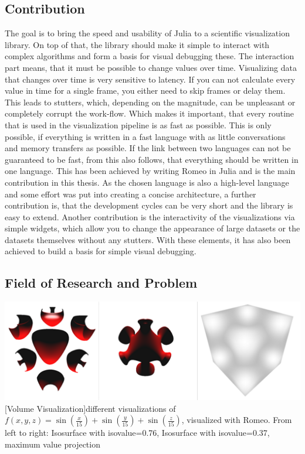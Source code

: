 \subsection{Contribution}

The goal is to bring the speed and usability of Julia to a scientific visualization library.
On top of that, the library should make it simple to interact with complex algorithms and form a basis for visual debugging these.
The interaction part means, that it must be possible to change values over time.
Visualizing data that changes over time is very sensitive to latency. 
If you can not calculate every value in time for a single frame, you either need to skip frames or delay them.
This leads to stutters, which, depending on the magnitude, can be unpleasant or completely corrupt the work-flow.
Which makes it important, that every routine that is used in the visualization pipeline is as fast as possible.
This is only possible, if everything is written in a fast language with as little conversations and memory transfers as possible. If the link between two languages can not be guaranteed to be fast, from this also follows, that everything should be written in one language.
This has been achieved by writing Romeo in Julia and is the main contribution in this thesis.
As the chosen language is also a high-level language and some effort was put into creating a concise architecture, a further contribution is, that the development cycles can be very short and the library is easy to extend.
Another contribution is the interactivity of the visualizations via simple widgets, which allow you to change the appearance of large datasets or the datasets themselves without any stutters.
With these elements, it has also been achieved to build a basis for simple visual debugging.


\subsection{Field of Research and Problem}

\vspace{1em}
\begin{minipage}{\linewidth}
    \centering
    \includegraphics[width=0.7\linewidth]{graphics/surfaces.png}
    [Volume Visualization]{different visualizations of $f(x,y,z)=\sin(\frac{x}{15})+\sin(\frac{y}{15})+\sin(\frac{z}{15})$, visualized with Romeo. From left to right: Isosurface with isovalue=0.76, Isosurface with isovalue=0.37, maximum value projection}
    \label{fig:volume}
\end{minipage}
\vspace{1em}

